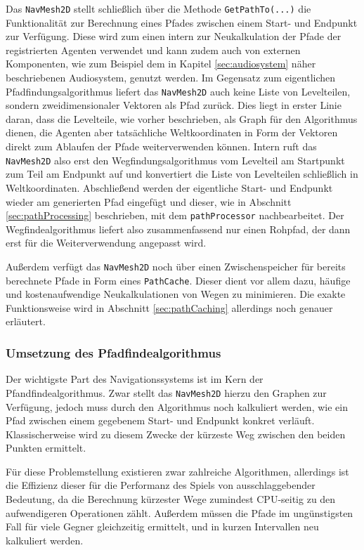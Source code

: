 Das \texttt{NavMesh2D} stellt schließlich über die Methode \texttt{GetPathTo(...)} die Funktionalität zur Berechnung eines Pfades zwischen einem Start- und Endpunkt zur Verfügung. Diese wird zum einen intern zur Neukalkulation der Pfade der registrierten Agenten verwendet und kann zudem auch von externen Komponenten, wie zum Beispiel dem in Kapitel \ref{sec:audiosystem} näher beschriebenen Audiosystem, genutzt werden. Im Gegensatz zum eigentlichen Pfadfindungsalgorithmus liefert das \texttt{NavMesh2D} auch keine Liste von Levelteilen, sondern zweidimensionaler Vektoren als Pfad zurück. Dies liegt in erster Linie daran, dass die Levelteile, wie vorher beschrieben, als Graph für den Algorithmus dienen, die Agenten aber tatsächliche Weltkoordinaten in Form der Vektoren direkt zum Ablaufen der Pfade weiterverwenden können. Intern ruft das \texttt{NavMesh2D} also erst den Wegfindungsalgorithmus vom Levelteil am Startpunkt zum Teil am Endpunkt auf und konvertiert die Liste von Levelteilen schließlich in Weltkoordinaten. Abschließend werden der eigentliche Start- und Endpunkt wieder am generierten Pfad eingefügt und dieser, wie in Abschnitt \ref{sec:pathProcessing} beschrieben, mit dem \texttt{pathProcessor} nachbearbeitet. Der Wegfindealgorithmus liefert also zusammenfassend nur einen Rohpfad, der dann erst für die Weiterverwendung angepasst wird.

Außerdem verfügt das \texttt{NavMesh2D} noch über einen Zwischenspeicher für bereits berechnete Pfade in Form eines \texttt{PathCache}. Dieser dient vor allem dazu, häufige und kostenaufwendige Neukalkulationen von Wegen zu minimieren. Die exakte Funktionsweise wird in Abschnitt \ref{sec:pathCaching} allerdings noch genauer erläutert.

\subsubsection{Umsetzung des Pfadfindealgorithmus}\label{sec:pathfindingAlgo}
Der wichtigste Part des Navigationssystems ist im Kern der Pfandfindealgorithmus. Zwar stellt das \texttt{NavMesh2D} hierzu den Graphen zur Verfügung, jedoch muss durch den Algorithmus noch kalkuliert werden, wie ein Pfad zwischen einem gegebenem Start- und Endpunkt konkret verläuft. Klassischerweise wird zu diesem Zwecke der kürzeste Weg zwischen den beiden Punkten ermittelt.

Für diese Problemstellung existieren zwar zahlreiche Algorithmen, allerdings ist die Effizienz dieser für die Performanz des Spiels von ausschlaggebender Bedeutung, da die Berechnung kürzester Wege zumindest CPU-seitig zu den aufwendigeren Operationen zählt. Außerdem müssen die Pfade im ungünstigsten Fall für viele Gegner gleichzeitig ermittelt, und in kurzen Intervallen neu kalkuliert werden.

